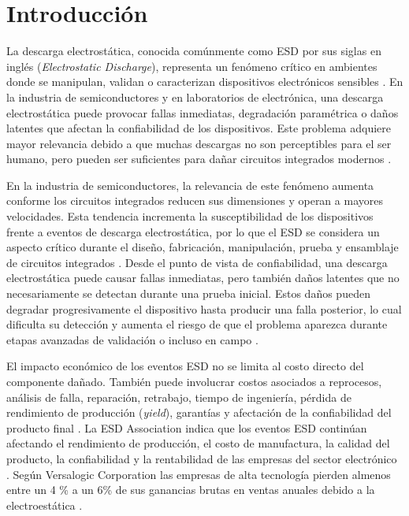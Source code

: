 \chapter{Introducción}

La descarga electrostática, conocida comúnmente como ESD por sus siglas en inglés
(\textit{Electrostatic Discharge}), representa un fenómeno crítico en ambientes donde se
manipulan, validan o caracterizan dispositivos electrónicos sensibles \cite{ESDAPrinciples2}. En la industria de
semiconductores y en laboratorios de electrónica, una descarga electrostática puede
provocar fallas inmediatas, degradación paramétrica o daños latentes que afectan la
confiabilidad de los dispositivos. Este problema adquiere mayor relevancia debido a que
muchas descargas no son perceptibles para el ser humano, pero pueden ser suficientes
para dañar circuitos integrados modernos \cite{TI2014}.

En la industria de semiconductores, la relevancia de este fenómeno aumenta conforme 
los circuitos integrados reducen sus dimensiones y operan a mayores velocidades. 
Esta tendencia incrementa la susceptibilidad de los dispositivos frente a eventos 
de descarga electrostática, por lo que el ESD se considera un aspecto crítico durante 
el diseño, fabricación, manipulación, prueba y ensamblaje de circuitos integrados \cite{ESDA1}. 
Desde el punto de vista de confiabilidad, una descarga electrostática puede causar fallas inmediatas, 
pero también daños latentes que no necesariamente se detectan durante una prueba inicial. 
Estos daños pueden degradar progresivamente el dispositivo hasta producir una falla posterior, 
lo cual dificulta su detección y aumenta el riesgo de que el problema aparezca durante 
etapas avanzadas de validación o incluso en campo \cite{TI2014}. 

El impacto económico de los eventos ESD no se limita al costo directo del componente dañado. 
También puede involucrar costos asociados a reprocesos, análisis de falla, reparación, 
retrabajo, tiempo de ingeniería, pérdida de rendimiento de producción (\textit{yield}), 
garantías y afectación de la confiabilidad del producto final \cite{versalogic_esd}. La ESD Association 
indica que los eventos ESD continúan afectando el rendimiento de producción, el costo 
de manufactura, la calidad del producto, la confiabilidad y la rentabilidad de las 
empresas del sector electrónico \cite{ESDA1}. Según Versalogic Corporation
las empresas de alta tecnología pierden almenos entre un 4 \% a un 6\% de sus ganancias brutas en 
ventas anuales debido a la electroestática \cite{versalogic_esd}.

